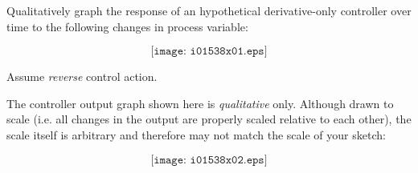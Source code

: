 

Qualitatively graph the response of an hypothetical derivative-only controller over time to the following changes in process variable:

$$\texttt{[image: i01538x01.eps]}$$

Assume {\it reverse} control action.
 






The controller output graph shown here is {\it qualitative} only.  Although drawn to scale (i.e. all changes in the output are properly scaled relative to each other), the scale itself is arbitrary and therefore may not match the scale of your sketch:

$$\texttt{[image: i01538x02.eps]}$$











